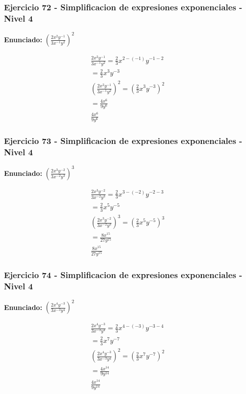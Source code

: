 \documentclass[12pt,a4paper]{article}
\begin{document}
\subsubsection*{Ejercicio 72 - Simplificacion de expresiones exponenciales - Nivel 4}
\textbf{Enunciado:} \(\left(\frac{2x^{2}y^{-1}}{3x^{-1}y^{2}}\right)^{2}\)

\[
\begin{aligned}
\frac{2x^{2}y^{-1}}{3x^{-1}y^{2}}=\frac{2}{3}x^{2-(-1)}y^{-1-2}\\
=\frac{2}{3}x^{3}y^{-3}\\
\left(\frac{2x^{2}y^{-1}}{3x^{-1}y^{2}}\right)^{2}=\left(\frac{2}{3}x^{3}y^{-3}\right)^{2}\\
=\frac{4x^{6}}{9y^{6}}\\
\boxed{\frac{4x^{6}}{9y^{6}}}
\end{aligned}
\]


\subsubsection*{Ejercicio 73 - Simplificacion de expresiones exponenciales - Nivel 4}
\textbf{Enunciado:} \(\left(\frac{2x^{3}y^{-2}}{3x^{-2}y^{3}}\right)^{3}\)

\[
\begin{aligned}
\frac{2x^{3}y^{-2}}{3x^{-2}y^{3}}=\frac{2}{3}x^{3-(-2)}y^{-2-3}\\
=\frac{2}{3}x^{5}y^{-5}\\
\left(\frac{2x^{3}y^{-2}}{3x^{-2}y^{3}}\right)^{3}=\left(\frac{2}{3}x^{5}y^{-5}\right)^{3}\\
=\frac{8x^{15}}{27y^{15}}\\
\boxed{\frac{8x^{15}}{27y^{15}}}
\end{aligned}
\]


\subsubsection*{Ejercicio 74 - Simplificacion de expresiones exponenciales - Nivel 4}
\textbf{Enunciado:} \(\left(\frac{2x^{4}y^{-3}}{3x^{-3}y^{4}}\right)^{2}\)

\[
\begin{aligned}
\frac{2x^{4}y^{-3}}{3x^{-3}y^{4}}=\frac{2}{3}x^{4-(-3)}y^{-3-4}\\
=\frac{2}{3}x^{7}y^{-7}\\
\left(\frac{2x^{4}y^{-3}}{3x^{-3}y^{4}}\right)^{2}=\left(\frac{2}{3}x^{7}y^{-7}\right)^{2}\\
=\frac{4x^{14}}{9y^{14}}\\
\boxed{\frac{4x^{14}}{9y^{14}}}
\end{aligned}
\]
\end{document}
